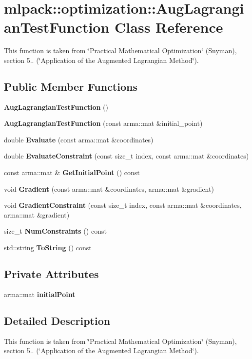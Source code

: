 \section{mlpack\-:\-:optimization\-:\-:Aug\-Lagrangian\-Test\-Function Class Reference}
\label{classmlpack_1_1optimization_1_1AugLagrangianTestFunction}


This function is taken from \char`\"{}\-Practical Mathematical Optimization\char`\"{} (Snyman), section 5.. (\char`\"{}\-Application of the Augmented Lagrangian Method\char`\"{}).  


\subsection*{Public Member Functions}
\begin{DoxyCompactItemize}
\item 
{\bf Aug\-Lagrangian\-Test\-Function} ()
\item 
{\bf Aug\-Lagrangian\-Test\-Function} (const arma\-::mat \&initial\-\_\-point)
\item 
double {\bf Evaluate} (const arma\-::mat \&coordinates)
\item 
double {\bf Evaluate\-Constraint} (const size\-\_\-t index, const arma\-::mat \&coordinates)
\item 
const arma\-::mat \& {\bf Get\-Initial\-Point} () const 
\item 
void {\bf Gradient} (const arma\-::mat \&coordinates, arma\-::mat \&gradient)
\item 
void {\bf Gradient\-Constraint} (const size\-\_\-t index, const arma\-::mat \&coordinates, arma\-::mat \&gradient)
\item 
size\-\_\-t {\bf Num\-Constraints} () const 
\item 
std\-::string {\bf To\-String} () const 
\end{DoxyCompactItemize}
\subsection*{Private Attributes}
\begin{DoxyCompactItemize}
\item 
arma\-::mat {\bf initial\-Point}
\end{DoxyCompactItemize}


\subsection{Detailed Description}
This function is taken from \char`\"{}\-Practical Mathematical Optimization\char`\"{} (Snyman), section 5.. (\char`\"{}\-Application of the Augmented Lagrangian Method\char`\"{}). 

